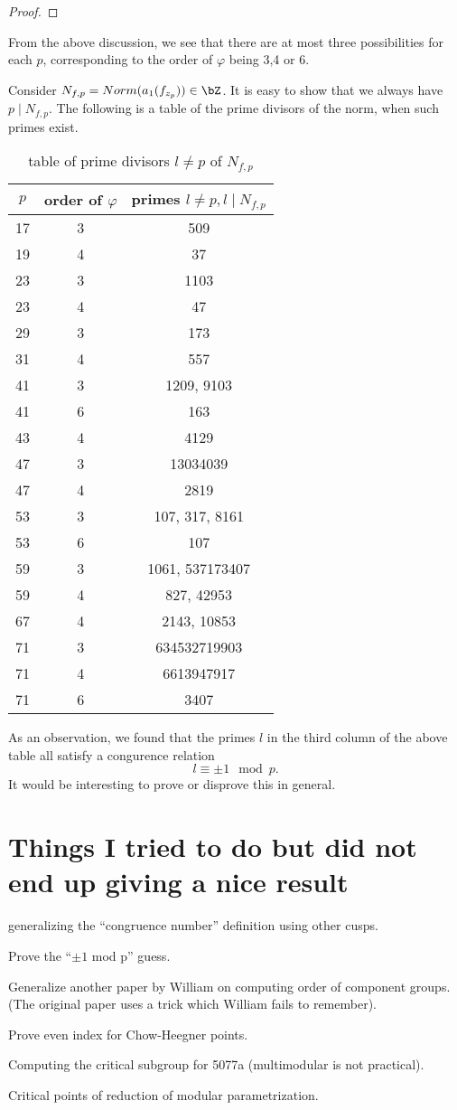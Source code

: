 \documentclass [11pt, proquest] {uwthesis}[2015/03/03]
\begin{document}
\begin{proof}
\end{proof}

From the 
above discussion, we see that there are at most three possibilities for each $p$, corresponding to the order of $\varphi$ being 3,4 or 6. 

Consider $N_{f,p} = Norm(a_1(f_{z_p})) \in \bZ$. It is easy to show that we always have $p \mid N_{f,p}$. The following is a table of the prime divisors of the norm, when such primes exist.

\begin{table}
\centering
\caption{table of prime divisors $l \neq p$ of $N_{f,p}$}
\begin{tabular}{c|c|c}
$p$ & order of $\varphi$ & primes  $l \neq p, l \mid N_{f,p}$ \\ \hline
17 & 3 & 509 \\
19 & 4 & 37 \\
23 & 3 & 1103 \\
23 & 4 & 47 \\
29 & 3 & 173 \\
31 & 4 & 557 \\
41 & 3 & 1209, 9103 \\
41 & 6 & 163 \\
43 & 4 & 4129 \\
47 & 3 & 13034039 \\
47 & 4 & 2819 \\
53 & 3 & 107, 317, 8161 \\
53 & 6 & 107  \\
59 & 3 & 1061, 537173407 \\
59 & 4 & 827, 42953 \\
67 & 4 & 2143, 10853 \\
71 & 3 & 634532719903 \\
71 & 4 & 6613947917 \\
71 & 6 & 3407 
\end{tabular}
\end{table}

As an observation, we found that the primes $l$ in the third column of the above table all satisfy a congurence relation
\[
	l \equiv \pm 1 \mod{p}. 
\]
It would be interesting to prove or disprove this in general. 

\chapter{Things I tried to do but did not end up giving a nice result}

generalizing the ``congruence number'' definition using other cusps.  

Prove the ``$\pm 1$ mod p'' guess. 

Generalize another paper by William on computing order of component groups. (The original paper uses a trick which 
William fails to remember). 

Prove even index for Chow-Heegner points. 

Computing the critical subgroup for 5077a (multimodular is not practical). 

Critical points of reduction of modular parametrization. 


\nocite{*}


\end{document}
